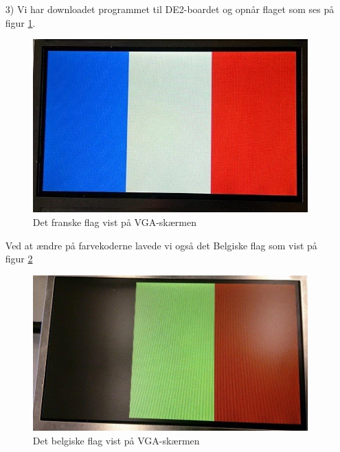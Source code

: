 \begin{enumerate}
\begin{lstlisting}[caption={syncGenerator Procedure Code},label={lst:Procedure_code}]
vsync <= vSyncOut;				 -- connect vsync to entity
hsync <= hSyncOut;               -- connect hsync to entity
clockOut <= clk25;               -- 25 MHz clock for DAC 
blank <= not (vBlank or hBlank); -- active low blanking.
compSync <= '1'; 				 -- Never perform any composite sync. 
end testGenerator;
	\end{lstlisting}
\item[3)] 
Vi har downloadet programmet til DE2-boardet og opnår flaget som ses på figur \ref{fig:frenchFlag}.
	\begin{figure}[H]
		\centering
		\includegraphics[scale=0.4]{pictures/Oevelse8/opg2/franskFlag}
		\caption{Det franske flag vist på VGA-skærmen}
		\label{fig:frenchFlag}
	\end{figure}
Ved at ændre på farvekoderne lavede vi også det Belgiske flag som vist på figur \ref{fig:belgiskflag}
\begin{figure}[H]
	\centering
	\includegraphics[scale=0.3]{pictures/Oevelse8/opg2/belgiskFlag}
	\caption{Det belgiske flag vist på VGA-skærmen}
	\label{fig:belgiskflag}
\end{figure}
\end{enumerate}